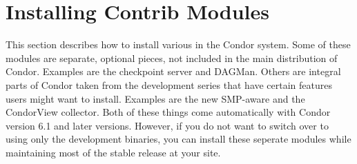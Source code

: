\section{\label{sec:Contrib-Install}Installing Contrib Modules}

This section describes how to install various 
in the Condor system.
Some of these modules are separate, optional pieces, not included in
the main distribution of Condor.
Examples are the checkpoint server and DAGMan.
Others are integral parts of Condor taken from the development series
that have certain features users might want to install.
Examples are the new SMP-aware  and the CondorView
collector.  
Both of these things come automatically with Condor version 6.1 and
later versions.
However, if you do not want to switch over to using only the
development binaries, you can install these seperate modules
while
maintaining most of the stable release at your site.









